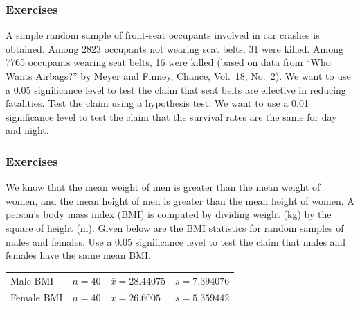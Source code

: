 \documentclass[xcolor=dvipsnames]{beamer}
\begin{document}
\begin{frame}
  \frametitle{Exercises}
 A simple random sample of front-seat
occupants involved in car crashes is obtained. Among 2823 occupants
not wearing scat belts, 31 were killed. Among 7765 occupants wearing
seat belts, 16 were killed (based on data from ``Who Wants Airbags?'' by
Meyer and Finney, Chance, Vol.\ 18, No.\ 2). We want to use a 0.05
significance level to test the claim that seat belts are effective in
reducing fatalities. Test the claim using a hypothesis test. We want
to use a 0.01 significance level to test the claim that the survival
rates are the same for day and night.
\end{frame}




\begin{frame}
  \frametitle{Exercises}
 We know that the mean weight of men is
greater than the mean weight of women, and the mean height of men is
greater than the mean height of women. A person's body mass index
(BMI) is computed by dividing weight (kg) by the square of height (m).
Given below are the BMI statistics for random samples of males and
females. Use a 0.05 significance level to test the claim that males
and females have the same mean BMI. 

\medskip

\begin{tabular}{llll}
  Male BMI & $n=40$ & $\bar{x}=28.44075$ & $s=7.394076$ \\ 
  Female BMI & $n=40$ & $\bar{x}=26.6005$ & $s=5.359442$ \\
\end{tabular}
\end{frame}
\end{document}
